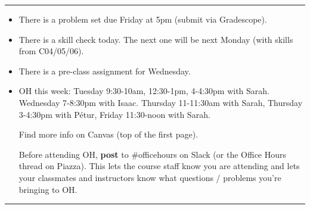 \documentclass[12pt,letterpaper,noanswers]{exam}
\begin{document}
 \pdfpageheight 11in 
  \pdfpagewidth 8.5in

\vspace{0.2cm}

\hrule
\vspace{0.2cm}

\begin{itemize}
    \item There is a problem set due Friday at 5pm (submit via Gradescope).
    \item There is a skill check today.  The next one will be next Monday (with skills from C04/05/06).
    \item There is a pre-class assignment for Wednesday.
    \item OH this week: Tuesday 9:30-10am, 12:30-1pm, 4-4:30pm with Sarah.  Wednesday 7-8:30pm with Isaac.  Thursday 11-11:30am with Sarah, Thursday 3-4:30pm with P\'etur, Friday 11:30-noon with Sarah.
    
    Find more info on Canvas (top of the first page).  
    
    Before attending OH, \textbf{post} to \#officehours on Slack (or the Office Hours thread on Piazza).  This lets the course staff know you are attending and lets your classmates and instructors know what questions / problems you're bringing to OH.
\end{itemize}

\hrule
\vspace{0.2cm}
\end{document}
